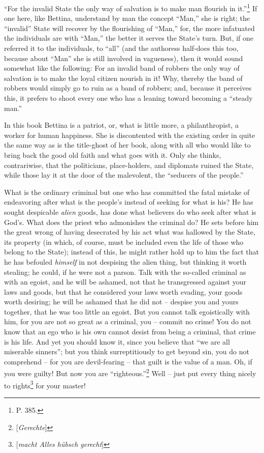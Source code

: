 ``For the invalid State the only way of salvation is to make man flourish in 
it.''\footnote{P. 385.} If one here, like Bettina, understand by man the 
concept ``Man,'' she is right; the ``invalid'' State will recover by the 
flourishing of ``Man,'' for, the more infatuated the individuals are with 
``Man,'' the better it serves the State's turn. But, if one referred it to 
the individuals, to ``all'' (and the authoress half-does this too, because 
about ``Man'' she is still involved in vagueness), then it would sound 
somewhat like the following: For an invalid band of robbers the only way of 
salvation is to make the loyal citizen nourish in it! Why, thereby the band of 
robbers would simply go to ruin as a band of robbers; and, because it 
perceives this, it prefers to shoot every one who has a leaning toward 
becoming a ``steady man.''

In this book Bettina is a patriot, or, what is little more, a philanthropist, 
a worker for human happiness. She is discontented with the existing order in 
quite the same way as is the title-ghost of her book, along with all who would 
like to bring back the good old faith and what goes with it. Only she thinks, 
contrariwise, that the politicians, place-holders, and diplomats ruined the 
State, while those lay it at the door of the malevolent, the ``seducers of 
the people.''

What is the ordinary criminal but one who has committed the fatal mistake of 
endeavoring after what is the people's instead of seeking for what is his? He 
has sought despicable \textit{alien} goods, has done what believers do who 
seek after what is God's. What does the priest who admonishes the criminal do? 
He sets before him the great wrong of having desecrated by his act what was 
hallowed by the State, its property (in which, of course, must be included 
even the life of those who belong to the State); instead of this, he might 
rather hold up to him the fact that he has befouled \textit{himself} in not 
despising the alien thing, but thinking it worth stealing; he could, if he 
were not a parson. Talk with the so-called criminal as with an egoist, and he 
will be ashamed, not that he transgressed against your laws and goods, but 
that he considered your laws worth evading, your goods worth desiring; he will 
be ashamed that he did not -- despise you and yours together, that he was too 
little an egoist. But you cannot talk egoistically with him, for you are not 
so great as a criminal, you -- commit no crime! You do not know that an ego 
who is his own cannot desist from being a criminal, that crime is his life. 
And yet you should know it, since you believe that ``we are all miserable 
sinners''; but you think surreptitiously to get beyond sin, you do not 
comprehend -- for you are devil-fearing -- that guilt is the value of a man. 
Oh, if you were guilty! But now you are 
``righteous.''\footnote{[\textit{Gerechte}]} Well -- just put every thing 
nicely to rights\footnote{[\textit{macht Alles h\"ubsch gerecht}]} for your 
master!

